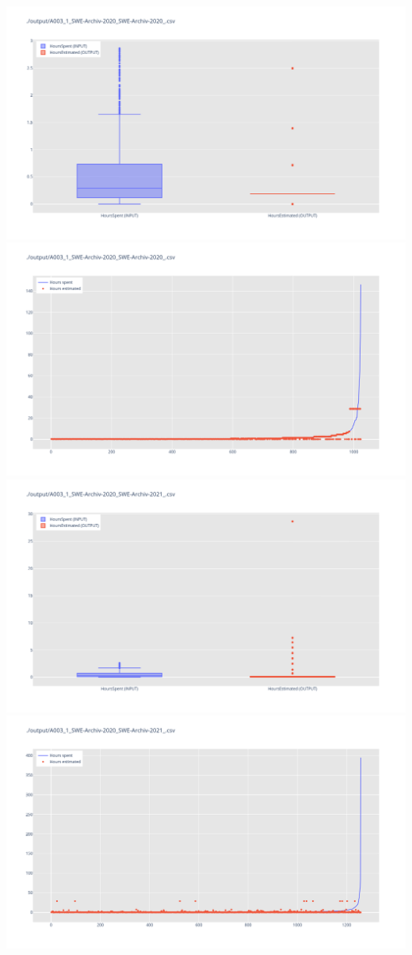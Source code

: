 \includegraphics[width=\textwidth]{Scripts/output/A003_1_SWE-Archiv-2020_SWE-Archiv-2020_.csv.png}
\includegraphics[width=\textwidth]{Scripts/output/A003_1_SWE-Archiv-2020_SWE-Archiv-2020_.csv.scatter.png}
\includegraphics[width=\textwidth]{Scripts/output/A003_1_SWE-Archiv-2020_SWE-Archiv-2021_.csv.png}
\includegraphics[width=\textwidth]{Scripts/output/A003_1_SWE-Archiv-2020_SWE-Archiv-2021_.csv.scatter.png}
